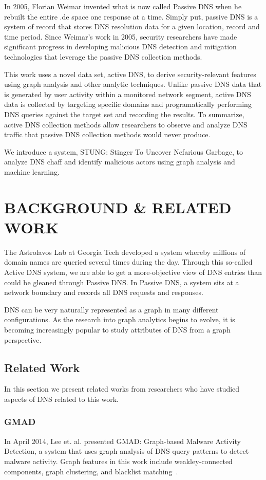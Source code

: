 \documentclass{acm_proc_article-sp}
\begin{document}
In 2005, Florian Weimar invented what is now called Passive DNS when he rebuilt the entire .de space one response at a time. Simply put, passive DNS is a system of record that stores DNS resolution data for a given location, record and time period. Since Weimar's work in 2005, security researchers have made significant progress in developing malicious DNS detection and mitigation technologies that leverage the passive DNS collection methods.  

This work uses a novel data set, active DNS, to derive security-relevant features using graph analysis and other analytic techniques. Unlike passive DNS data that is generated by user activity within a monitored network segment, active DNS data is collected by targeting specific domains and programatically performing DNS queries against the target set and recording the results. To summarize, active DNS collection methods allow researchers to observe and analyze DNS traffic that passive DNS collection methods would never produce.  

We introduce a system, STUNG: Stinger To Uncover Nefarious Garbage, to analyze DNS chaff and identify malicious actors using graph analysis and machine learning.

\section{BACKGROUND \& RELATED WORK}
The Astrolavos Lab at Georgia Tech developed a system whereby millions of domain names are queried several times during the day. Through this so-called Active DNS system, we are able to get a more-objective view of DNS entries than could be gleaned through Passive DNS. In Passive DNS, a system sits at a network boundary and records all DNS requests and responses.

DNS can be very naturally represented as a graph in many different configurations. As the research into graph analytics begins to evolve, it is becoming increasingly popular to study attributes of DNS from a graph perspective.

\subsection{Related Work}
In this section we present related works from researchers who have studied aspects of DNS related to this work.

\subsubsection{GMAD}
In April 2014, Lee et. al. presented GMAD: Graph-based Malware Activity Detection, a system that uses graph analysis of DNS query patterns to detect malware activity. Graph features in this work include weakley-connected components, graph clustering, and blacklist matching~\cite{GMAD}.
\end{document}
